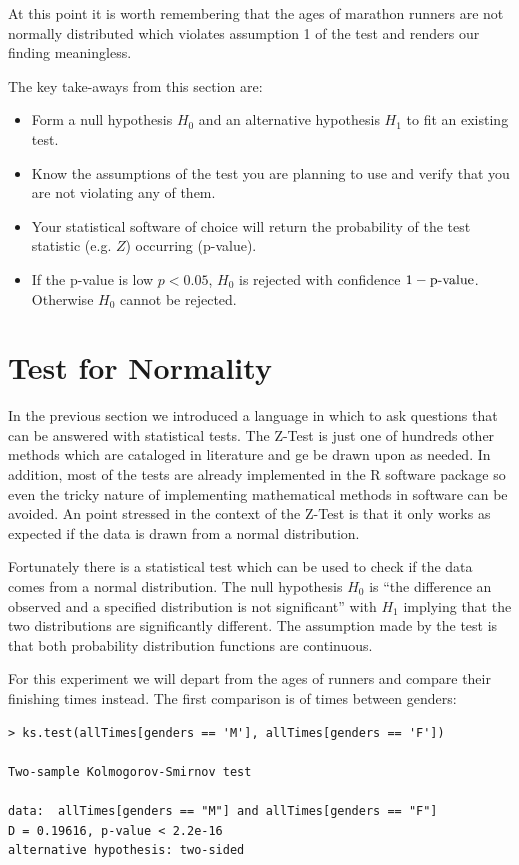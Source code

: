 \documentclass{tufte-book} %
\begin{document}
At this point it is worth remembering that the ages of marathon runners are not normally distributed which violates assumption 1 of the test and renders our finding meaningless.

\begin{tcolorbox}
	The key take-aways from this section are:
	\begin{itemize}
		\item Form a null hypothesis $H_0$ and an alternative hypothesis $H_1$ to fit an existing test.
		\item Know the assumptions of the test you are planning to use and verify that you are not violating any of them.
		\item Your statistical software of choice will return the probability of the test statistic (e.g. $Z$) occurring (p-value).
		\item If the p-value is low $p<0.05$, $H_0$ is rejected with confidence $1 - \hbox{p-value}$. Otherwise $H_0$ cannot be rejected.
	\end{itemize}
\end{tcolorbox}

\section{Test for Normality}
In the previous section we introduced a language in which to ask questions that can be answered with statistical tests. The \hbox{Z-Test} is just one of hundreds other methods which are cataloged in literature\cite{kanji2006} and ge be drawn upon as needed. In addition, most of the tests are already implemented in the R software package so even the tricky nature of implementing mathematical methods in software can be avoided. An point stressed in the context of the \hbox{Z-Test} is that it only works as expected if the data is drawn from a normal distribution. 

Fortunately there is a statistical test which can be used to check if the data comes from a normal distribution. The null hypothesis $H_0$ is ``the difference an observed and a specified distribution is not significant'' with $H_1$ implying that the two distributions are significantly different. The assumption made by the test is that both probability distribution functions are continuous.

For this experiment we will depart from the ages of runners and compare their finishing times instead. The first comparison is of times between genders:

\begin{Verbatim}
> ks.test(allTimes[genders == 'M'], allTimes[genders == 'F'])

Two-sample Kolmogorov-Smirnov test

data:  allTimes[genders == "M"] and allTimes[genders == "F"]
D = 0.19616, p-value < 2.2e-16
alternative hypothesis: two-sided
\end{Verbatim}
\end{document}
